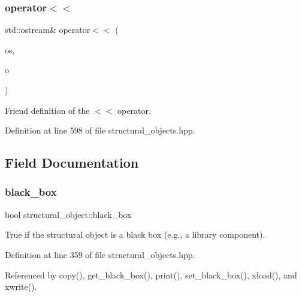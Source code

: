 \subsubsection{\texorpdfstring{operator$<$$<$}{operator<<}}
{\footnotesize\ttfamily std\+::ostream\& operator$<$$<$ (\begin{DoxyParamCaption}\item[{std\+::ostream \&}]{os,  }\item[{const \hyperlink{structural__objects_8hpp_a8ea5f8cc50ab8f4c31e2751074ff60b2}{structural\+\_\+object\+Ref}}]{o }\end{DoxyParamCaption})\hspace{0.3cm}{\ttfamily [friend]}}



Friend definition of the $<$$<$ operator. 



Definition at line 598 of file structural\+\_\+objects.\+hpp.



\subsection{Field Documentation}
\mbox{\label{classstructural__object_a03b36075116b434d1629fc7eeb4f452c}} 
\subsubsection{\texorpdfstring{black\+\_\+box}{black\_box}}
{\footnotesize\ttfamily bool structural\+\_\+object\+::black\+\_\+box\hspace{0.3cm}{\ttfamily [private]}}



True if the structural object is a black box (e.\+g., a library component). 



Definition at line 359 of file structural\+\_\+objects.\+hpp.



Referenced by copy(), get\+\_\+black\+\_\+box(), print(), set\+\_\+black\+\_\+box(), xload(), and xwrite().

\mbox{\label{classstructural__object_a4a659fd0650644dfaab84e5c297af4b2}} 

